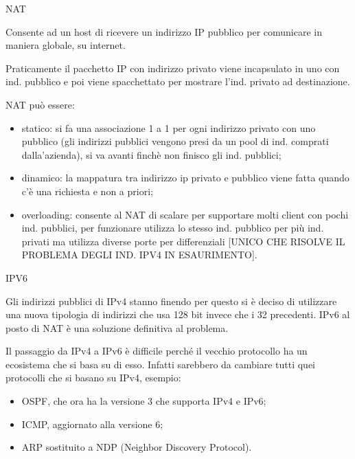 \documentclass[
]{article}
\providecommand{\tightlist}{%
  \setlength{\itemsep}{0pt}\setlength{\parskip}{0pt}}
\begin{document}
{}

{NAT}

{Consente ad un host di ricevere un indirizzo IP pubblico per comunicare
in maniera globale, su internet.}

{}

{Praticamente il pacchetto IP con indirizzo privato viene incapsulato in
uno con ind. pubblico e poi viene spacchettato per mostrare l'ind.
privato ad destinazione.}

{}

{NAT può essere:}

\begin{itemize}
\tightlist
\item
  {statico: si fa una associazione 1 a 1 per ogni indirizzo privato con
  uno pubblico (gli indirizzi pubblici vengono presi da un pool di ind.
  comprati }{dalla'azienda), si va avanti finchè non finisco gli ind.
  pubblici;}
\item
  {dinamico: la mappatura tra indirizzo ip privato e pubblico viene
  fatta quando c'è una richiesta e non a priori;}
\item
  {overloading}{: consente al NAT di scalare per supportare molti client
  con pochi ind. pubblici, per funzionare utilizza lo stesso ind.
  pubblico per più ind. privati ma utilizza diverse porte per
  differenziali }{{[}UNICO CHE RISOLVE IL PROBLEMA DEGLI IND. IPV4 IN
  ESAURIMENTO{]}}{.}
\end{itemize}

{}

{}

{IPV6}

{Gli indirizzi pubblici di IPv4 stanno finendo per questo si è deciso di
utilizzare una nuova tipologia di indirizzi che usa 128 bit invece che i
32 precedenti. IPv6 al posto di NAT è una soluzione definitiva al
problema.}

{}

{Il passaggio da IPv4 a IPv6 è difficile perché il vecchio protocollo ha
un ecosistema che si basa su di esso. Infatti sarebbero da cambiare
tutti quei protocolli che si basano su IPv4, esempio:}

\begin{itemize}
\tightlist
\item
  {OSPF, che ora ha la versione 3 che supporta IPv4 e IPv6;}
\item
  {ICMP, aggiornato alla versione 6;}
\item
  {ARP sostituito a NDP (Neighbor Discovery Protocol).}
\end{itemize}
\end{document}
